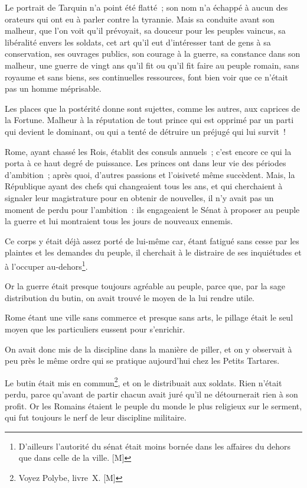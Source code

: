 \documentclass[french,twoside]{book} %
\begin{document}
Le portrait de Tarquin n’a point été flatté ; son nom n’a échappé à aucun des orateurs qui ont eu à parler contre la tyrannie. Mais sa conduite avant son malheur, que l’on voit qu’il prévoyait, sa douceur pour les peuples vaincus, sa libéralité envers les soldats, cet art qu’il eut d’intéresser tant de gens à sa conservation, ses ouvrages publics, son courage à la guerre, sa constance dans son malheur, une guerre de vingt ans qu’il fit ou qu’il fit faire au peuple romain, sans royaume et sans biens, ses continuelles ressources, font bien voir que ce n’était pas un homme méprisable.\par
Les places que la postérité donne sont sujettes, comme les autres, aux caprices de la Fortune. Malheur à la réputation de tout prince qui est opprimé par un parti qui devient le dominant, ou qui a tenté de détruire un préjugé qui lui survit !\par
Rome, ayant chassé les Rois, établit des consuls annuels ; c’est encore ce qui la porta à ce haut degré de puissance. Les princes ont dans leur vie des périodes d’ambition ; après quoi, d’autres passions et l’oisiveté même succèdent. Mais, la République ayant des chefs qui changeaient tous les ans, et qui cherchaient à signaler leur magistrature pour en obtenir de nouvelles, il n’y avait pas un moment de perdu pour l’ambition : ils engageaient le Sénat à proposer au peuple la guerre et lui montraient tous les jours de nouveaux ennemis.\par
Ce corps y était déjà assez porté de lui-même car, étant fatigué sans cesse par les plaintes et les demandes du peuple, il cherchait à le distraire de ses inquiétudes et à l’occuper au-dehors\footnote{D’ailleurs l’autorité du sénat était moins bornée dans les affaires du dehors que dans celle de la ville. [M]}.\par
Or la guerre était presque toujours agréable au peuple, parce que, par la sage distribution du butin, on avait trouvé le moyen de la lui rendre utile.\par
Rome étant une ville sans commerce et presque sans arts, le pillage était le seul moyen que les particuliers eussent pour s’enrichir.\par
On avait donc mis de la discipline dans la manière de piller, et on y observait à peu près le même ordre qui se pratique aujourd’hui chez les Petits Tartares.\par
Le butin était mis en commun\footnote{Voyez Polybe, livre X. [M]}, et on le distribuait aux soldats. Rien n’était perdu, parce qu’avant de partir chacun avait juré qu’il ne détournerait rien à son profit. Or les Romains étaient le peuple du monde le plus religieux sur le serment, qui fut toujours le nerf de leur discipline militaire.\par
\end{document}
